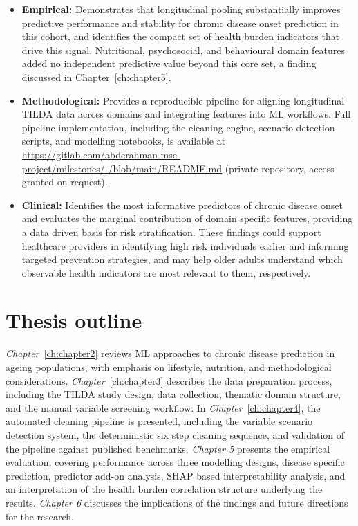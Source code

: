\begin{itemize}
  \item \textbf{Empirical:} Demonstrates that longitudinal pooling substantially improves predictive performance and stability for chronic disease onset prediction in this cohort, and identifies the compact set of health burden indicators that drive this signal. Nutritional, psychosocial, and behavioural domain features added no independent predictive value beyond this core set, a finding discussed in Chapter~\ref{ch:chapter5}.
  \item \textbf{Methodological:} Provides a reproducible pipeline for aligning longitudinal \gls{TILDA} data across domains and integrating features into \gls{ML} workflows. Full pipeline implementation, including the cleaning engine, scenario detection scripts, and modelling notebooks, is available at \url{https://gitlab.com/abderahman-msc-project/milestones/-/blob/main/README.md} (private repository, access granted on request).
  \item \textbf{Clinical:} Identifies the most informative predictors of chronic disease onset and evaluates the marginal contribution of domain specific features, providing a data driven basis for risk stratification. These findings could support healthcare providers in identifying high risk individuals earlier and informing targeted prevention strategies, and may help older adults understand which observable health indicators are most relevant to them, respectively.
\end{itemize}

\section{Thesis outline}

\emph{Chapter}~\ref{ch:chapter2} reviews \gls{ML} approaches to chronic disease prediction in ageing populations, with emphasis on lifestyle, nutrition, and methodological considerations.
\emph{Chapter}~\ref{ch:chapter3} describes the data preparation process, including the \gls{TILDA} study design, data collection, thematic domain structure, and the manual variable screening workflow.
In \emph{Chapter}~\ref{ch:chapter4}, the automated cleaning pipeline is presented, including the variable scenario detection system, the deterministic six step cleaning sequence, and validation of the pipeline against published benchmarks.
\emph{Chapter 5} presents the empirical evaluation, covering performance across three modelling designs, disease specific prediction, predictor add-on analysis, \gls{SHAP} based interpretability analysis, and an interpretation of the health burden correlation structure underlying the results.
\emph{Chapter 6} discusses the implications of the findings and future directions for the research.


